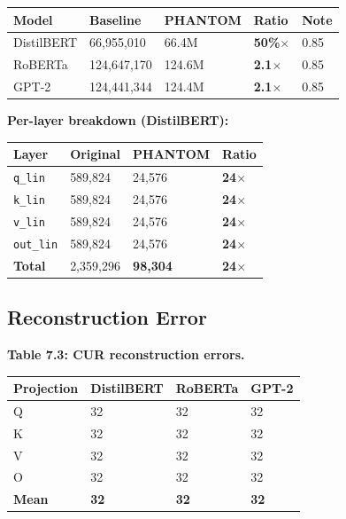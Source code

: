 \begin{table}[H]
\centering
\small
\begin{tabular}{lllll}
\toprule
\textbf{Model} & \textbf{Baseline} & \textbf{PHANTOM} & \textbf{Ratio} & \textbf{Note} \\
\midrule
DistilBERT & 66,955,010 & 66.4M & \textbf{50\%$\times$} & 0.85 \\
RoBERTa & 124,647,170 & 124.6M & \textbf{2.1$\times$} & 0.85 \\
GPT-2 & 124,441,344 & 124.4M & \textbf{2.1$\times$} & 0.85 \\
\bottomrule
\end{tabular}
\end{table}

\textbf{Per-layer breakdown (DistilBERT):}

\begin{table}[H]
\centering
\small
\begin{tabular}{llll}
\toprule
\textbf{Layer} & \textbf{Original} & \textbf{PHANTOM} & \textbf{Ratio} \\
\midrule
\texttt{q\_lin} & 589,824 & 24,576 & \textbf{24$\times$} \\
\texttt{k\_lin} & 589,824 & 24,576 & \textbf{24$\times$} \\
\texttt{v\_lin} & 589,824 & 24,576 & \textbf{24$\times$} \\
\texttt{out\_lin} & 589,824 & 24,576 & \textbf{24$\times$} \\
\textbf{Total} & 2,359,296 & \textbf{98,304} & \textbf{24$\times$} \\
\bottomrule
\end{tabular}
\end{table}

\subsection{Reconstruction Error}

\textbf{Table 7.3: CUR reconstruction errors.}

\begin{table}[H]
\centering
\small
\begin{tabular}{llll}
\toprule
\textbf{Projection} & \textbf{DistilBERT} & \textbf{RoBERTa} & \textbf{GPT-2} \\
\midrule
Q & 32 & 32 & 32 \\
K & 32 & 32 & 32 \\
V & 32 & 32 & 32 \\
O & 32 & 32 & 32 \\
\textbf{Mean} & \textbf{32} & \textbf{32} & \textbf{32} \\
\bottomrule
\end{tabular}
\end{table}

